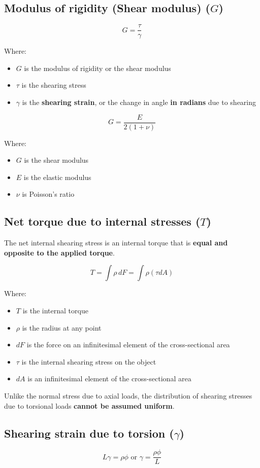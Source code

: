 \documentclass[11pt]{article}
\begin{document}
\subsection{Modulus of rigidity (Shear modulus) (\(G\))}
\label{sec:org286aa0a}
\[G = \frac{\tau}{\gamma}\]

Where:
\begin{itemize}
\item \(G\) is the modulus of rigidity or the shear modulus
\item \(\tau\) is the shearing stress
\item \(\gamma\) is the \textbf{shearing strain}, or the change in angle \textbf{in radians} due to shearing
\end{itemize}

\[G = \frac{E}{2(1 + \nu)}\]

Where:
\begin{itemize}
\item \(G\) is the shear modulus
\item \(E\) is the elastic modulus
\item \(\nu\) is Poisson's ratio
\end{itemize}
\subsection{Net torque due to internal stresses (\(T\))}
\label{sec:org80039d9}
The net internal shearing stress is an internal torque that is \textbf{equal and opposite to the applied torque}.

\[T = \int \rho \, dF = \int \rho (\tau dA)\]

Where:
\begin{itemize}
\item \(T\) is the internal torque
\item \(\rho\) is the radius at any point
\item \(dF\) is the force on an infinitesimal element of the cross-sectional area
\item \(\tau\) is the internal shearing stress on the object
\item \(dA\) is an infinitesimal element of the cross-sectional area
\end{itemize}

Unlike the normal stress due to axial loads, the distribution of shearing stresses due to torsional loads \textbf{cannot be assumed uniform}.

\newpage
\subsection{Shearing strain due to torsion (\(\gamma\))}
\label{sec:org9a2ba7d}
\[L \gamma = \rho \phi \text{ or } \gamma = \frac{\rho \phi}{L}\]
\end{document}

